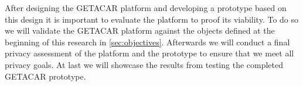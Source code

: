 After designing the GETACAR platform and developing a prototype based on this design it is important to evaluate the platform to proof its viability. To do so we will validate the GETACAR platform against the objects defined at the beginning of this research in \ref{sec:objectives}. Afterwards we will conduct a final privacy assessment of the platform and the prototype to ensure that we meet all privacy goals. At last we will showcase the results from testing the completed GETACAR prototype. 
